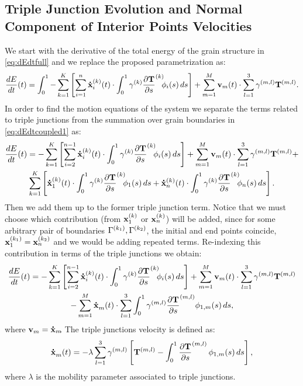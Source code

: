 \subsection{Triple Junction Evolution and Normal Component of Interior Points Velocities}
We start with the derivative of the total energy of the grain structure in \eqref{eq:dEdtfull} and we replace the proposed parametrization as:
\begin{equation}
    \frac{dE}{dt}(t) = \int_0^1 -\sum_{k=1}^{K}\left[ \sum_{i=1}^{n} \dotx[i][k](t)  \cdot \int_0^1  \gamma^{(k)}\dTds^{(k)}\!\! \phi_i(s)\,ds \right] + \sum_{m=1}^{M} \vel_m(t) \cdot \sum_{l=1}^3 \gamma^{(m,l)}\T^{(m,l)}.
    \label{eq:dEdtcoupled1}
\end{equation}
In order to find the motion equations of the system we separate the terms related to triple junctions from the summation over grain boundaries in \eqref{eq:dEdtcoupled1} as:
\begin{multline*}
    \frac{dE}{dt}(t) =  -\sum_{k=1}^{K}\left[ \sum_{i=2}^{n-1} \dotx[i][k](t)  \cdot \int_0^1  \gamma^{(k)}\dTds^{(k)}\!\! \phi_i(s)\,ds \right] + \sum_{m=1}^{M} \vel_m(t) \cdot \sum_{l=1}^3 \gamma^{(m,l)}\T^{(m,l)} + \\ \sum_{k=1}^K \left[\dotx[1][k](t)\cdot\int_0^1 \gamma^{(k)} \dTds^{(k)}\!\! \phi_1(s)\,ds + \dotx[n][k](t)\cdot\int_0^1 \gamma^{(k)} \dTds^{(k)}\!\! \phi_n(s)\,ds\right].
\end{multline*}
Then we add them up to the former triple junction term. Notice that we must choose which contribution (from $\x[1][k]$ or $\x[n][k]$) will be added, since for some arbitrary pair of boundaries $\Gamma^{(k_1)}, \Gamma^{(k_2)}$, the initial and end points coincide, \ie $\x[1][k_1] = \x[n][k_2]$ and we would be adding repeated terms. Re-indexing this contribution in terms of the triple junctions we obtain:
\begin{multline}
    \frac{dE}{dt}(t) =   -\sum_{k=1}^{K}\left[ \sum_{i=2}^{n-1} \dotx[i][k](t)  \cdot \int_0^1  \gamma^{(k)}\dTds^{(k)}\!\! \phi_i(s)\,ds \right] + \sum_{m=1}^{M} \vel_m(t) \cdot \sum_{l=1}^3 \gamma^{(m,l)}\T^{(m,l)}\\ -\sum_{m=1}^{M} \dotx[m]\,\,(t) \cdot \sum_{l=1}^3 \int_0^1 \gamma^{(m,l)} \dTds^{(m,l)}\phi_{1,m}(s)\,ds,
    \label{eq:dEdtcoupled3}
\end{multline}
where $\vel_m = \dotx[m]$.
The triple junctions velocity is defined as:
\begin{align}
     \dotx[m]\,\,(t) = -\lambda\sum_{l=1}^{3}\gamma^{(m,l)} \left[\T^{(m,l)} - \int_0^1 \dTds^{(m,l)}\,\phi_{1,m}(s)\,ds \right],
    \label{eq:triplejunctionsvel}
\end{align}
where $\lambda$ is the mobility parameter associated to triple junctions.

